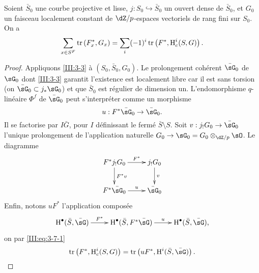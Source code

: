 \begin{theorem_}\label{III:4-1bis}
Soient $\bar S_0$ une courbe projective et lisse, 
$j:S_0\hookrightarrow \bar S_0$ un ouvert dense de $\bar S_0$, et $G_0$ un 
faisceau localement constant de $\dZ/p$-espaces vectoriels de rang fini sur 
$S_0$. On a 
\begin{equation}\label{III:eq:4-4-1}
  \sum_{x\in S^F} \operatorname{tr}\left(F_x^*,G_x\right) = \sum_i (-1)^i \operatorname{tr}\left(F^*,\operatorname{H}_c^i(S,G)\right) \text{.}
\end{equation}
\end{theorem_}
\begin{proof}
Appliquons \ref{III:3-3} à $(S_0,\bar S_0,G_0)$. Le prolongement cohérent 
$\bar\sG_0$ de $\sG_0$ dont \ref{III:3-3} garantit l'existence est localement 
libre car il est sans torsion (on  $\bar\sG_0\subset j_*\sG_0$) et que 
$\bar S_0$  est régulier de dimension un. L'endomorphisme $q$-linéaire 
$\Phi^f$ de $\bar\sG_0$ peut s'interpréter comme un morphisme 
\[
  u : F^*\bar\sG_0 \to \bar\sG_0 \text{.}
\]
Il se factorise par $I\bar G$, pour $I$ définissant le fermé 
$\bar S\setminus S$. Soit $v:j_!G_0 \to \bar\sG_0$ l'unique prolongement de 
l'application naturelle $G_0 \to \sG_0 = G_0\otimes_{\dZ/p}\sO$. Le diagramme 
\begin{equation}\label{III:eq:4-4-2}
\xymatrix{
  F^* j_! G_0 \ar[r]^-{F^*} \ar[d]^-{F^* v} 
    & j_! G_0 \ar[d]^-v \\
  F^*\bar \sG_0 \ar[r]^-u 
    & \bar\sG_0
}
\end{equation}
Enfin, notons $u F^*$ l'application composée 
\[\xymatrix{
  \h^\bullet(\bar S,\bar\sG) \ar[r]^-{F^*} 
    & \h^\bullet(\bar S,F^*\bar\sG) \ar[r]^-u 
    & \h^\bullet(\bar S,\bar\sG) \text{,}
}\]
on par \eqref{III:eq:3-7-1}
\begin{equation}\label{III:eq:4-4-3}
  \tr\left(F^*,\h_c^i(S,G)\right) = \tr\left(u F^*,\h^i(\bar S,\bar\sG)\right) \text{.}
\end{equation}


\end{proof}
